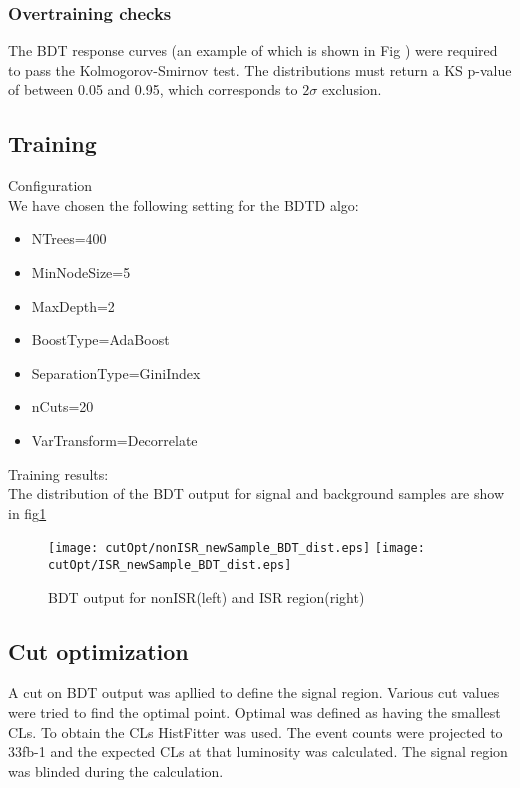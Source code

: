 
\normalsize

\subsubsection*{Overtraining checks}
The BDT response curves (an example of which is shown in Fig ) were required to pass the Kolmogorov-Smirnov test. The distributions must return a KS p-value of between 0.05 and 0.95, which corresponds to $2\sigma$ exclusion.

 


\FloatBarrier
\subsection{Training}
Configuration\\
We have chosen the following setting for the BDTD algo:
\begin{itemize}
\item NTrees=400
\item MinNodeSize=5%
\item MaxDepth=2
\item BoostType=AdaBoost
\item SeparationType=GiniIndex
\item nCuts=20
\item VarTransform=Decorrelate
\end{itemize}


Training results:\\
The distribution of the BDT output for signal and background samples are show in fig\ref{fig:BDT_output}

\begin{figure}
\texttt{[image: cutOpt/nonISR\_newSample\_BDT\_dist.eps]}
\texttt{[image: cutOpt/ISR\_newSample\_BDT\_dist.eps]}
\caption{BDT output for nonISR(left) and ISR region(right)}
\label{fig:BDT_output}
\end{figure}

\subsection{Cut optimization}
A cut on BDT output was apllied to define the signal region. Various cut values were tried to find the optimal point. Optimal was defined as having the smallest CLs. To obtain the CLs HistFitter was used. The event counts were projected to 33fb-1 and the expected CLs at that luminosity was calculated. The signal region was blinded during the calculation.

